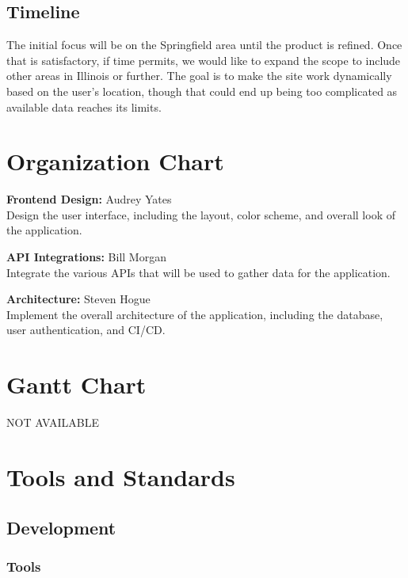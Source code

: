 \documentclass[12pt]{article}
\begin{document}
\subsection{Timeline}

The initial focus will be on the Springfield area until the product is refined. Once that is satisfactory, if time permits, we would like to expand the scope to include other areas in Illinois or further. The goal is to make the site work dynamically based on the user's location, though that could end up being too complicated as available data reaches its limits.

\section{Organization Chart}

\textbf{Frontend Design:} Audrey Yates \\
Design the user interface, including the layout, color scheme, and overall look of the application.

\textbf{API Integrations:} Bill Morgan \\
Integrate the various APIs that will be used to gather data for the application.

\textbf{Architecture:} Steven Hogue \\
Implement the overall architecture of the application, including the database, user authentication, and CI/CD.

\section{Gantt Chart}
NOT AVAILABLE

\section{Tools and Standards}

\subsection{Development}
\subsubsection{Tools}
\end{document}

